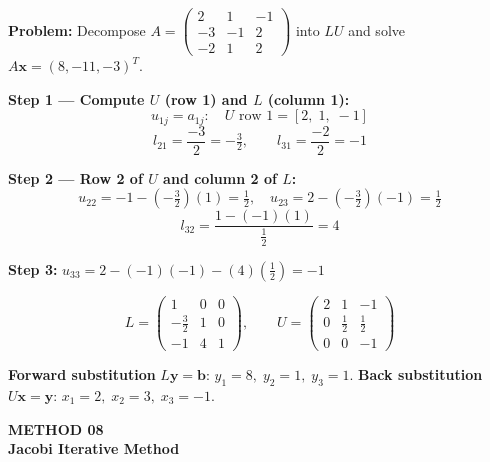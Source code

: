 \documentclass[12pt]{article}
\begin{document}
\bigskip

\begin{examplebox*}
\textbf{Problem:} Decompose $A = \begin{pmatrix}2 & 1 & -1\\-3 & -1 & 2\\-2 & 1 & 2\end{pmatrix}$ into $LU$ and solve $A\mathbf{x} = (8,-11,-3)^T$.

\textbf{Step 1 — Compute $U$ (row 1) and $L$ (column 1):}
\[
  u_{1j} = a_{1j}: \quad U\text{ row 1} = [2,\;1,\;-1]
\]
\[
  l_{21} = \frac{-3}{2} = -\tfrac{3}{2},\qquad l_{31} = \frac{-2}{2} = -1
\]

\textbf{Step 2 — Row 2 of $U$ and column 2 of $L$:}
\[
  u_{22} = -1 - (-\tfrac{3}{2})(1) = \tfrac{1}{2},\quad
  u_{23} = 2 - (-\tfrac{3}{2})(-1) = \tfrac{1}{2}
\]
\[
  l_{32} = \frac{1 - (-1)(1)}{\tfrac{1}{2}} = 4
\]

\textbf{Step 3:}\; $u_{33} = 2 - (-1)(-1) - (4)(\tfrac{1}{2}) = -1$

\[
  L = \begin{pmatrix}1 & 0 & 0\\-\tfrac{3}{2} & 1 & 0\\-1 & 4 & 1\end{pmatrix},\qquad
  U = \begin{pmatrix}2 & 1 & -1\\0 & \tfrac{1}{2} & \tfrac{1}{2}\\0 & 0 & -1\end{pmatrix}
\]

\textbf{Forward substitution} $L\mathbf{y} = \mathbf{b}$: $y_1=8,\; y_2=1,\; y_3=1$.
\textbf{Back substitution} $U\mathbf{x} = \mathbf{y}$: $\boxed{x_1=2,\; x_2=3,\; x_3=-1}$.
\end{examplebox*}

\newpage


\begin{tcolorbox}[
  enhanced, arc=0pt, boxrule=0pt,
  colback=primary, colframe=primary,
  left=16pt, right=16pt, top=14pt, bottom=10pt,
  borderline south={4pt}{0pt}{accent},
]
  {\color{accent!70}\small\bfseries METHOD 08}\\[4pt]
  {\LARGE\bfseries\color{white} Jacobi Iterative Method}
\end{tcolorbox}
\end{document}
